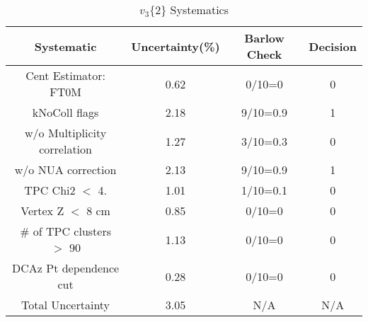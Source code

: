 \begin{table}[htbp]
\caption{$v_3\{2\}$ Systematics}
\label{tab:Sys_v32}
\centering
\begin{tabular}{|c|c|c|c|}
\hline
Systematic & Uncertainty(\%) & Barlow Check & Decision \\
\hline
Cent Estimator: FT0M & 0.62 & 0/10=0 & 0 \\
kNoColl flags & 2.18 & 9/10=0.9 & 1 \\
w/o Multiplicity correlation & 1.27 & 3/10=0.3 & 0 \\
w/o NUA correction & 2.13 & 9/10=0.9 & 1 \\
TPC Chi2 $<$ 4. & 1.01 & 1/10=0.1 & 0 \\
Vertex Z $<$ 8 cm & 0.85 & 0/10=0 & 0 \\
\# of TPC clusters $>$ 90 & 1.13 & 0/10=0 & 0 \\
DCAz Pt dependence cut & 0.28 & 0/10=0 & 0 \\
\hline
Total Uncertainty & 3.05 & N/A & N/A \\
\hline
\end{tabular}
\end{table}
